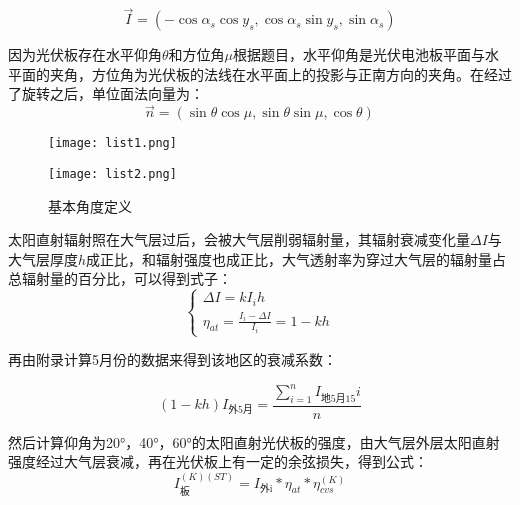 \documentclass[withoutpreface,bwprint]{cumcmthesis} %
\begin{document}
\begin{equation}
	\overrightarrow{I} = (-\cos \alpha_{s}\cos y_{s}, \cos \alpha_{s}\sin y_{s},\sin \alpha_{s})
	\label{eq:004}
\end{equation}

因为光伏板存在水平仰角$\theta$和方位角$\mu$根据题目，水平仰角是光伏电池板平面与水平面的夹角，方位角为光伏板的法线在水平面上的投影与正南方向的夹角。在经过了旋转之后，单位面法向量为：
\begin{equation}
	\overrightarrow{n} = (\sin \theta \cos \mu,\sin \theta \sin \mu,\cos \theta)
	\label{eq:004}
\end{equation}

\begin{figure}
	\centering
	\begin{minipage}[c]{0.48\textwidth}
		\centering
		\texttt{[image: list1.png]}
	\end{minipage}
	\begin{minipage}[c]{0.48\textwidth}
		\centering
		\texttt{[image: list2.png]}
	\end{minipage}
	\caption{基本角度定义}
\end{figure}

太阳直射辐射照在大气层过后，会被大气层削弱辐射量，其辐射衰减变化量$\Delta I$与大气层厚度$h$成正比，和辐射强度也成正比，大气透射率为穿过大气层的辐射量占总辐射量的百分比，可以得到式子：
\begin{equation}
	\begin{cases}
		\Delta I = kI_{i}h \\
		\eta_{at} = \frac{I_{i} - \Delta I}{I_{i}} = 1-kh 
	\end{cases}
	\label{eq:012}
\end{equation}

再由附录计算5月份的数据来得到该地区的衰减系数：

\begin{equation}
	(1-kh)I_{\mbox{外5月}} = \frac{\sum_{i = 1}^{n} I_{\mbox{地5月15}} i}{n}
	\label{eq:013}
\end{equation}

然后计算仰角为20°，40°，60°的太阳直射光伏板的强度，由大气层外层太阳直射强度经过大气层衰减，再在光伏板上有一定的余弦损失，得到公式：
\begin{equation}
	I_{\mbox{板}}^{(K)(ST)} = I_{\mbox{外i}} * {\eta_{at}} * \eta_{cvs}^{(K)}
	\label{eq:013}
\end{equation}
\end{document}
